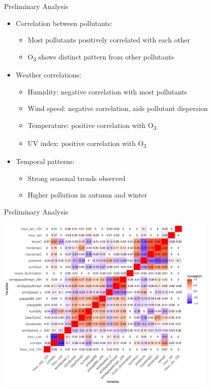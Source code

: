 \documentclass[svgnames, 10pt]{beamer}
\begin{document}
\begin{frame}{Preliminary Analysis}
    \begin{itemize}
       \item Correlation between pollutants:
           \begin{itemize}
               \item Most pollutants positively correlated with each other
               \item O\textsubscript{3} shows distinct pattern from other pollutants
           \end{itemize}
       \item Weather correlations:
           \begin{itemize}
               \item Humidity: negative correlation with most pollutants
               \item Wind speed: negative correlation, aids pollutant dispersion
               \item Temperature: positive correlation with O\textsubscript{3}
               \item UV index: positive correlation with O\textsubscript{3}
           \end{itemize}
       \item Temporal patterns:
           \begin{itemize}
               \item Strong seasonal trends observed
               \item Higher pollution in autumn and winter
           \end{itemize}
    \end{itemize}
\end{frame}

\begin{frame}{Preliminary Analysis}
    \vspace{0.5em}
    \begin{center}
        \includegraphics[width=0.8\textwidth]{assets/feature-correlation-matrix-final.png}
    \end{center}
    \vfill
\end{frame}
\end{document}
